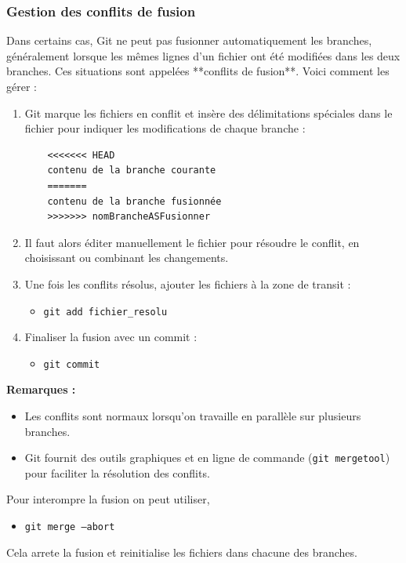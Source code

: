 \documentclass{article}
\begin{document}
\subsubsection{Gestion des conflits de fusion}

Dans certains cas, Git ne peut pas fusionner automatiquement les branches, généralement lorsque les mêmes lignes d’un fichier ont été modifiées dans les deux branches. Ces situations sont appelées **conflits de fusion**. Voici comment les gérer :

\begin{enumerate}
    \item Git marque les fichiers en conflit et insère des délimitations spéciales dans le fichier pour indiquer les modifications de chaque branche :
    \begin{verbatim}
    <<<<<<< HEAD
    contenu de la branche courante
    =======
    contenu de la branche fusionnée
    >>>>>>> nomBrancheASFusionner
    \end{verbatim}
    \item Il faut alors éditer manuellement le fichier pour résoudre le conflit, en choisissant ou combinant les changements.
    \item Une fois les conflits résolus, ajouter les fichiers à la zone de transit :
    \begin{itemize}
        \item \texttt{git add fichier\_resolu}
    \end{itemize}
    \item Finaliser la fusion avec un commit :
    \begin{itemize}
        \item \texttt{git commit}
    \end{itemize}
\end{enumerate}

\textbf{Remarques :}
\begin{itemize}
    \item Les conflits sont normaux lorsqu’on travaille en parallèle sur plusieurs branches.
    \item Git fournit des outils graphiques et en ligne de commande (\texttt{git mergetool}) pour faciliter la résolution des conflits.
\end{itemize}
Pour interompre la fusion on peut utiliser,
\begin{itemize}
    \item \texttt{git merge --abort}
\end{itemize}
Cela arrete la fusion et reinitialise les fichiers dans chacune des branches.
\end{document}
